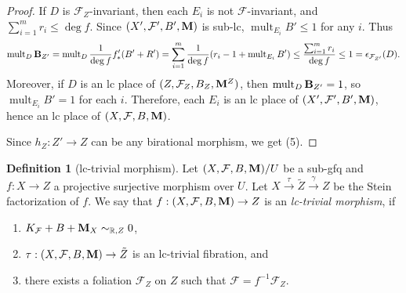 \documentclass[11pt]{amsart}
\numberwithin{equation}{section}
\newcommand{\Mm}{{\bf{M}}}
\newcommand{\Rr}{\mathbb{R}}
\newcommand{\mult}{\operatorname{mult}}
\newcommand{\Bb}{{\bf{B}}}
\newcommand{\Ff}{\mathcal{F}}
\theoremstyle{definition}
\newtheorem{defn}[thm]{Definition}
\theoremstyle{definition}
\theoremstyle{definition}
\begin{document}
\begin{proof}
If $D$ is $\Ff_Z$-invariant, then each $E_i$ is not $\Ff$-invariant, and $\sum_{i=1}^mr_i\leq\deg f$. Since $(X',\Ff',B',\Mm)$ is sub-lc, $\mult_{E_i}B'\leq 1$ for any $i$. Thus
$$\mult_D\Bb_{Z'}=\mult_D\frac{1}{\deg f}f'_*(B'+R')=\sum_{i=1}^m\frac{1}{\deg f}(r_i-1+\mult_{E_i}B')\leq\frac{\sum_{i=1}^mr_i}{\deg f}\leq 1=\epsilon_{\Ff_{Z'}}(D).$$
Moreover, if $D$ is an lc place of $(Z,\Ff_Z,B_Z,\Mm^Z)$, then $\mult_D\Bb_{Z'}=1$, so $\mult_{E_i}B'=1$ for each $i$. Therefore, each $E_i$ is an lc place of $(X',\Ff',B',\Mm)$, hence an lc place of $(X,\Ff,B,\Mm)$.

Since $h_Z: Z'\rightarrow Z$ can be any birational morphism, we get (5).
\end{proof}

\begin{defn}[lc-trivial morphism]\label{defn: lc trivial morphism}
Let $(X,\Ff,B,\Mm)/U$ be a sub-gfq and $f: X\rightarrow Z$ a projective surjective morphism over $U$. Let $X\xrightarrow{\tau}\tilde Z\xrightarrow{\gamma}Z$ be the Stein factorization of $f$. We say that $f: (X,\Ff,B,\Mm)\rightarrow Z$ is an \emph{lc-trivial morphism}, if
\begin{enumerate}
\item $K_{\Ff}+B+\Mm_X\sim_{\Rr,Z}0$,
\item $\tau: (X,\Ff,B,\Mm)\rightarrow\tilde Z$ is an lc-trivial fibration, and
\item there exists a foliation $\Ff_{Z}$ on $Z$ such that $\Ff=f^{-1}\Ff_Z$. 
\end{enumerate}
\end{defn}
\end{document}
